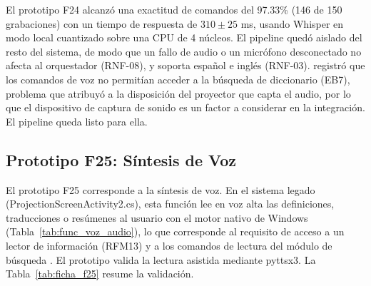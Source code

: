 El prototipo F24 alcanzó una exactitud de comandos del 97.33\% (146 de 150 grabaciones) con un tiempo de respuesta de $310 \pm 25$ ms, usando Whisper en modo local cuantizado sobre una CPU de 4 núcleos. El pipeline quedó aislado del resto del sistema, de modo que un fallo de audio o un micrófono desconectado no afecta al orquestador (RNF-08), y soporta español e inglés (RNF-03). \cite{ibaceta2023evaluacion} registró que los comandos de voz no permitían acceder a la búsqueda de diccionario (EB7), problema que atribuyó a la disposición del proyector que capta el audio, por lo que el dispositivo de captura de sonido es un factor a considerar en la integración. El pipeline queda listo para ella.
 
\subsection{Prototipo F25: Síntesis de Voz}
 
El prototipo F25 corresponde a la síntesis de voz. En el sistema legado (ProjectionScreenActivity2.cs), esta función lee en voz alta las definiciones, traducciones o resúmenes al usuario con el motor nativo de Windows (Tabla~\ref{tab:func_voz_audio}), lo que corresponde al requisito de acceso a un lector de información (RFM13) y a los comandos de lectura del módulo de búsqueda \citep{montanares2019desarrollo,ibaceta2023evaluacion}. El prototipo valida la lectura asistida mediante pyttsx3. La Tabla~\ref{tab:ficha_f25} resume la validación.
 
